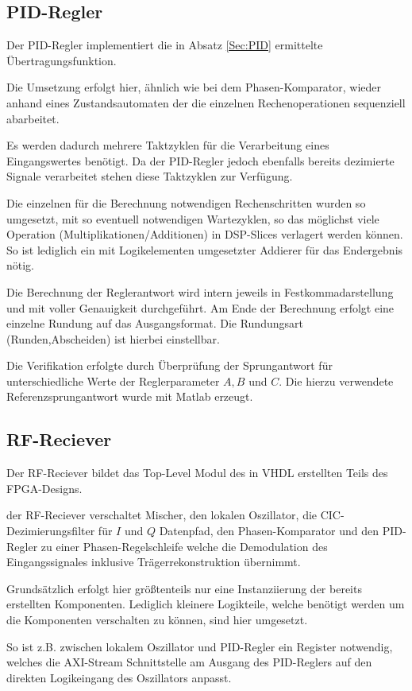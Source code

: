 \subsection{\acs{PID}-Regler}
Der \acs{PID}-Regler implementiert die in Absatz \ref{Sec:PID} ermittelte Übertragungsfunktion.

Die Umsetzung erfolgt hier, ähnlich wie bei dem Phasen-Komparator, wieder anhand eines Zustandsautomaten der die einzelnen Rechenoperationen sequenziell abarbeitet.

Es werden dadurch mehrere Taktzyklen für die Verarbeitung eines Eingangswertes benötigt.
Da der \acs{PID}-Regler jedoch ebenfalls bereits dezimierte Signale verarbeitet stehen diese Taktzyklen zur Verfügung. 

Die einzelnen für die Berechnung notwendigen Rechenschritten wurden so umgesetzt, mit so eventuell notwendigen Wartezyklen, so das möglichst viele Operation (Multiplikationen/Additionen) in 
\acs{DSP}-Slices verlagert werden können. So ist lediglich ein mit Logikelementen umgesetzter Addierer für das Endergebnis nötig.

Die Berechnung der Reglerantwort wird intern jeweils in Festkommadarstellung und mit voller Genauigkeit durchgeführt.
Am Ende der Berechnung erfolgt eine einzelne Rundung auf das Ausgangsformat. Die Rundungsart (Runden,Abscheiden) ist hierbei einstellbar.

Die Verifikation erfolgte durch Überprüfung der Sprungantwort für unterschiedliche Werte der Reglerparameter $A,B$ und $C$.
Die hierzu verwendete Referenzsprungantwort wurde mit Matlab erzeugt.

\subsection{RF-Reciever}
Der RF-Reciever bildet das Top-Level Modul des in \acs{VHDL} erstellten Teils des \acs{FPGA}-Designs.

der RF-Reciever verschaltet Mischer, den lokalen Oszillator, die \acs{CIC}-Dezimierungsfilter für $I$ und $Q$ Datenpfad, 
den Phasen-Komparator und den \acs{PID}-Regler zu einer Phasen-Regelschleife welche die Demodulation des Eingangssignales inklusive Trägerrekonstruktion übernimmt.

Grundsätzlich erfolgt hier größtenteils nur eine Instanziierung der bereits erstellten Komponenten.
Lediglich kleinere Logikteile, welche benötigt werden um die Komponenten verschalten zu können, sind hier umgesetzt.

So ist z.B. zwischen lokalem Oszillator und \acs{PID}-Regler ein Register notwendig, welches die \acs{AXI}-Stream Schnittstelle am Ausgang des \acs{PID}-Reglers 
auf den direkten Logikeingang des Oszillators anpasst.

